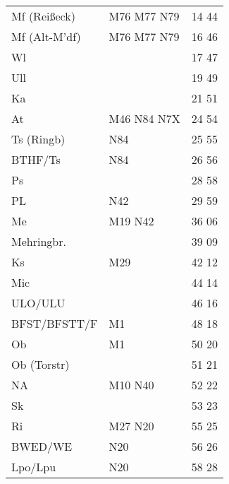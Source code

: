 \begin{tabular}{!{\color{schiefergrau}\vrule width 3pt}*{3}{l!{\color{schiefergrau}\vrule width 3pt}}}
\hline
{}
 \\
\hline
Mf (Reißeck) & \mbus{} M76 M77 \nbus{} N79         & 14 44 \\
Mf (Alt-M'df)& \mbus{} M76 M77 \nbus{} N79         & 16 46 \\
Wl           &                                     & 17 47 \\
Ull          &                                     & 19 49 \\
Ka           &                                     & 21 51 \\
At           & \mbus{} M46 \nbus{} N84 N7X         & 24 54 \\
Ts (Ringb)   & \nbus{} N84                         & 25 55 \\
BTHF/Ts      & \nbus{} N84                         & 26 56 \\
Ps           &                                     & 28 58 \\
PL           & \nbus{} N42                         & 29 59 \\
Me           & \nusieben{} \mbus{} M19 \nbus{} N42 & 36 06 \\
Mehringbr.   & \nueins{}                           & 39 09 \\
Ks           & \mbus{} M29                         & 42 12 \\
Mic          & \nuzwei{}                           & 44 14 \\
ULO/ULU      &                                     & 46 16 \\
BFST/BFSTT/F & \mtram{} M1                         & 48 18 \\
Ob           & \mtram{} M1                         & 50 20 \\
Ob (Torstr)  &                                     & 51 21 \\
NA           & \mtram{} M10 \nbus{} N40            & 52 22 \\
Sk           &                                     & 53 23 \\
Ri           & \mbus{} M27 \nbus{} N20             & 55 25 \\
BWED/WE      & \nbus{} N20                         & 56 26 \\
Lpo/Lpu      & \nuneun{} \nbus{} N20               & 58 28 \\

\end{tabular}
